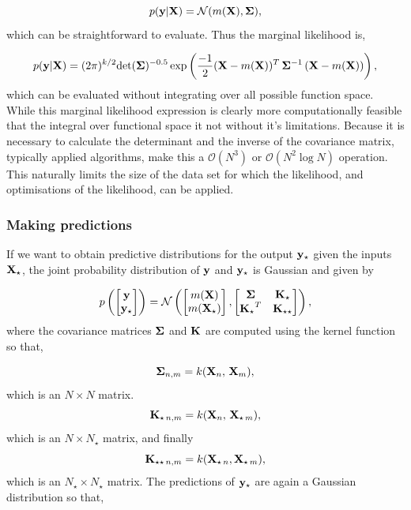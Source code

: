 \begin{equation}
p({\bf y} | {\bf X}) = \mathcal{N}(m({\bf X}), {\bf \Sigma}),
\end{equation}
which can be straightforward to evaluate. Thus the marginal likelihood is,

\begin{equation}
p({\bf y} | {\bf X}) = (2 \pi)^{k/2} {\rm det} ({\bf \Sigma})^{-0.5} \exp \left(\frac{-1}{2} ({\bf X} - m({\bf X}))^{T} \, {\bf \Sigma}^{-1} \, ({\bf X} - m({\bf X})) \right),
\end{equation}
which can be evaluated without integrating over all possible function space. While this marginal likelihood expression is clearly more computationally feasible that the integral over functional space it not without it's limitations.  Because it is necessary to calculate the determinant and the inverse of the covariance matrix, typically applied algorithms,  make this a $\mathcal{O}(N^3)$ or $\mathcal{O}(N^2 \log N)$ operation.  This naturally limits the size of the data set for which the likelihood,  and optimisations of the likelihood, can be applied.  

\subsubsection{Making predictions}
If we want to obtain predictive distributions for the output $\bf y_{\star}$ given the inputs $\bf X_{\star}$,  the joint probability distribution of $\bf y$ and $\bf y_{\star}$ is Gaussian and given by

\begin{equation}
p \left( \begin{bmatrix} {\bf y} \\ {\bf y_{\star}} \end{bmatrix} \right) = \mathcal{N} \left( \begin{bmatrix} m({\bf X}) \\ m({\bf X_{\star}}) \end{bmatrix} , \begin{bmatrix} {\bf \Sigma} & {\bf K_{\star} }\\ {\bf K_{\star}}^{T} & {\bf K_{\star \star}} \end{bmatrix}  \right), 
\end{equation}
where the covariance matrices $\bf \Sigma$ and $\bf K$ are computed using the kernel function so that,

\begin{equation}
{\bf \Sigma}_{n, m} = k({\bf X}_{n}, \, {\bf X}_{m}),
\end{equation}
which is an $N \times N$ matrix.
\begin{equation}
{\bf K}_{\star \, n, m} = k({\bf X}_{n}, \, { \bf X}_{\star \, m}),
\end{equation}
which is an $N \times N_{\star}$ matrix, and finally
\begin{equation}
{\bf K}_{\star \star \, n, m} = k({\bf X}_{\star \, n},  {\bf X}_{\star \,m}),
\end{equation}
which is an $N_{\star} \times N_{\star}$ matrix.
The predictions of $\bf y_{\star}$ are again a Gaussian distribution so that,

